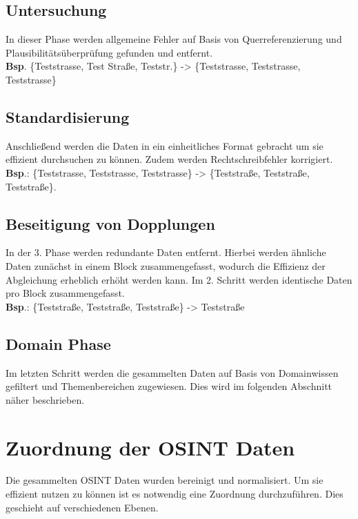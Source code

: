 \documentclass[twoside,a4paper]{article}
\begin{document}
\subsection{Untersuchung}
In dieser Phase werden allgemeine Fehler auf Basis von Querreferenzierung und Plausibilitätsüberprüfung gefunden und entfernt. \\
\textbf{Bsp}. \{Teststrasse, Test Straße, Teststr.\} -> \{Teststrasse, Teststrasse, Teststrasse\}

\subsection{Standardisierung}
\label{sub:Standardisierung}
Anschließend werden die Daten in ein einheitliches Format gebracht um sie effizient durchsuchen zu können. Zudem werden Rechtschreibfehler korrigiert. \\
\textbf{Bsp}.: \{Teststrasse, Teststrasse, Teststrasse\} -> \{Teststraße, Teststraße, Teststraße\}.

\subsection{Beseitigung von Dopplungen}
\label{sub:Dopplungen}
In der 3. Phase werden redundante Daten entfernt. Hierbei werden ähnliche Daten zunächst in einem Block zusammengefasst, wodurch die Effizienz der Abgleichung erheblich erhöht werden kann. Im 2. Schritt werden identische Daten pro Block zusammengefasst.\\
\textbf{Bsp}.: \{Teststraße, Teststraße, Teststraße\} -> Teststraße

\subsection{Domain Phase}
Im letzten Schritt werden die gesammelten Daten auf Basis von Domainwissen gefiltert und Themenbereichen zugewiesen. Dies wird im folgenden Abschnitt näher beschrieben.


\section{Zuordnung der OSINT Daten}
Die gesammelten OSINT Daten wurden bereinigt und normalisiert. Um sie effizient nutzen zu können ist es notwendig eine Zuordnung durchzuführen. Dies geschieht auf verschiedenen Ebenen.
\end{document}
